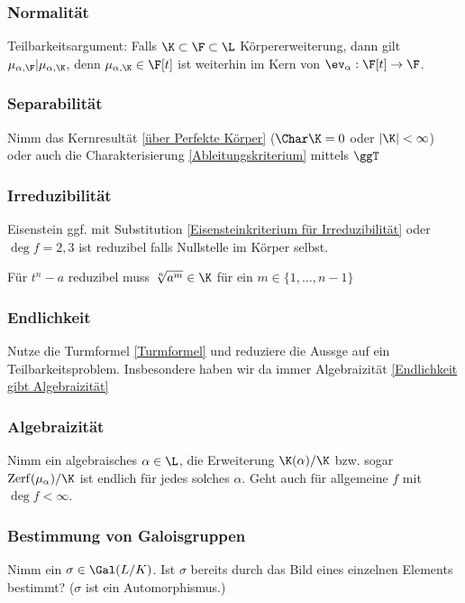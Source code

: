 \documentclass[11pt, a4paper]{article}
\begin{document}
\subsubsection{Normalität}
Teilbarkeitsargument: Falls $\K\subset \F\subset \L$ Körpererweiterung, dann gilt $\mu_{\alpha, \F}| \mu_{\alpha, \K}$, denn $\mu_{\alpha, \K}\in \F[t]$ ist weiterhin im Kern von $\ev_\alpha: \F[t] \to \F$.
\subsubsection{Separabilität}
Nimm das Kernresultät \ref{über Perfekte Körper} ($\Char \K = 0$ oder $|\K|< \infty$) oder auch die Charakterisierung \ref{Ableitungskriterium} mittels $\ggT$
\subsubsection{Irreduzibilität}
Eisenstein ggf. mit Substitution \ref{Eisensteinkriterium für Irreduzibilität} oder $\deg f=2,3$ ist reduzibel falls Nullstelle im Körper selbst.\par 
Für $t^n -a$ reduzibel muss $\sqrt[n]{a^m}\in \K$ für ein $m\in\{1,\dots, n-1\}$ 
\subsubsection{Endlichkeit}
Nutze die Turmformel \ref{Turmformel} und reduziere die Aussge auf ein Teilbarkeitsproblem. Insbesondere haben wir da immer Algebraizität \ref{Endlichkeit gibt Algebraizität}
\subsubsection{Algebraizität}
Nimm ein algebraisches $\alpha\in \L$, die Erweiterung $\K(\alpha)/\K$ bzw. sogar $\mathrm{Zerf}(\mu_\alpha)/\K$ ist endlich für jedes solches $\alpha$. Geht auch für allgemeine $f$ mit $\deg f<\infty$.
\subsubsection{Bestimmung von Galoisgruppen}
Nimm ein $\sigma\in \Gal(L/K)$. Ist $\sigma$ bereits durch das Bild eines einzelnen Elements bestimmt? ($\sigma$ ist ein Automorphismus.)
\PropertyNotice
\end{document}

